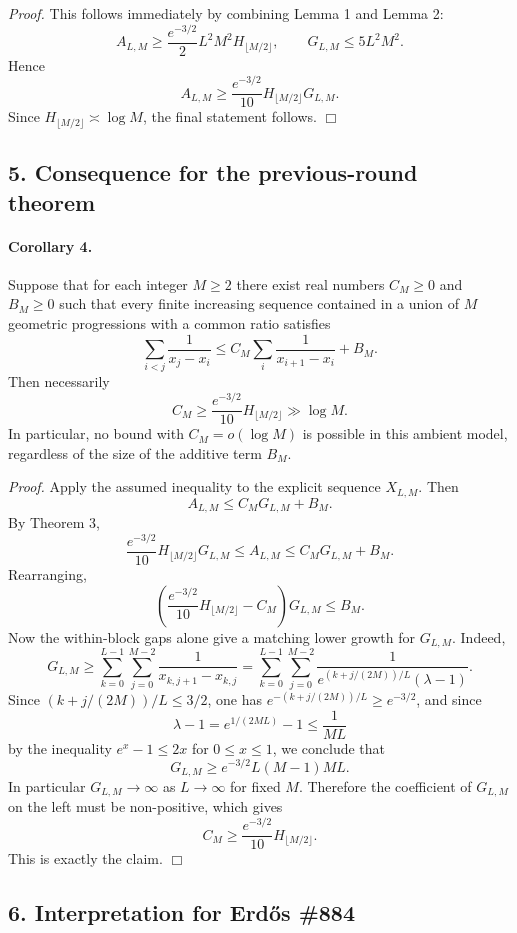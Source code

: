 \emph{Proof.}
This follows immediately by combining Lemma 1 and Lemma 2:
\[
A_{L,M}
\ge
\frac{e^{-3/2}}{2}L^2M^2H_{\lfloor M/2\rfloor},
\qquad
G_{L,M}\le 5L^2M^2.
\]
Hence
\[
A_{L,M}
\ge
\frac{e^{-3/2}}{10}H_{\lfloor M/2\rfloor}G_{L,M}.
\]
Since \(H_{\lfloor M/2\rfloor}\asymp \log M\), the final statement follows.
\hfill\(\Box\)

\subsection*{5. Consequence for the previous-round theorem}

\paragraph{Corollary 4.}
Suppose that for each integer \(M\ge 2\) there exist real numbers \(C_M\ge 0\) and \(B_M\ge 0\) such that every finite increasing sequence contained in a union of \(M\) geometric progressions with a common ratio satisfies
\[
\sum_{i<j}\frac{1}{x_j-x_i}
\le C_M\sum_i\frac{1}{x_{i+1}-x_i}+B_M.
\]
Then necessarily
\[
C_M\ge \frac{e^{-3/2}}{10}H_{\lfloor M/2\rfloor}
\gg \log M.
\]
In particular, no bound with \(C_M=o(\log M)\) is possible in this ambient model, regardless of the size of the additive term \(B_M\).

\emph{Proof.}
Apply the assumed inequality to the explicit sequence \(X_{L,M}\). Then
\[
A_{L,M}\le C_M G_{L,M}+B_M.
\]
By Theorem 3,
\[
\frac{e^{-3/2}}{10}H_{\lfloor M/2\rfloor}G_{L,M}
\le A_{L,M}
\le C_M G_{L,M}+B_M.
\]
Rearranging,
\[
\left(\frac{e^{-3/2}}{10}H_{\lfloor M/2\rfloor}-C_M\right)G_{L,M}
\le B_M.
\]
Now the within-block gaps alone give a matching lower growth for \(G_{L,M}\). Indeed,
\[
G_{L,M}\ge \sum_{k=0}^{L-1}\sum_{j=0}^{M-2}\frac{1}{x_{k,j+1}-x_{k,j}}
=\sum_{k=0}^{L-1}\sum_{j=0}^{M-2}\frac{1}{e^{(k+j/(2M))/L}(\lambda-1)}.
\]
Since \((k+j/(2M))/L\le 3/2\), one has \(e^{-(k+j/(2M))/L}\ge e^{-3/2}\), and since
\[
\lambda-1=e^{1/(2ML)}-1\le \frac{1}{ML}
\]
by the inequality \(e^x-1\le 2x\) for \(0\le x\le 1\), we conclude that
\[
G_{L,M}\ge e^{-3/2}L(M-1)ML.
\]
In particular \(G_{L,M}\to\infty\) as \(L\to\infty\) for fixed \(M\). Therefore the coefficient of \(G_{L,M}\) on the left must be non-positive, which gives
\[
C_M\ge \frac{e^{-3/2}}{10}H_{\lfloor M/2\rfloor}.
\]
This is exactly the claim.
\hfill\(\Box\)

\subsection*{6. Interpretation for Erd\H{o}s \#884}


